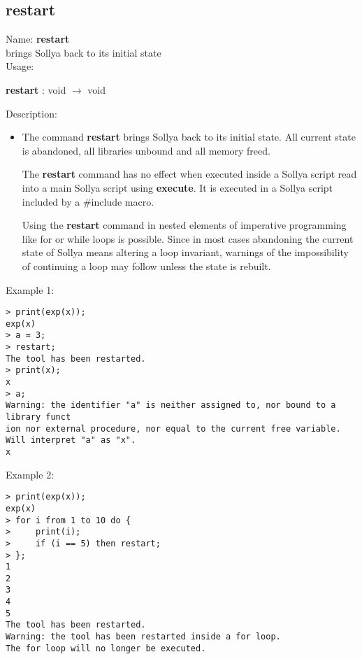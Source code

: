 \subsection{restart}
\label{labrestart}
\noindent Name: \textbf{restart}\\
brings Sollya back to its initial state\\

\noindent Usage: 
\begin{center}
\textbf{restart} : \textsf{void} $\rightarrow$ \textsf{void}\\
\end{center}
\noindent Description: \begin{itemize}

\item The command \textbf{restart} brings Sollya back to its initial state.  All
   current state is abandoned, all libraries unbound and all memory freed.
    
   The \textbf{restart} command has no effect when executed inside a Sollya
   script read into a main Sollya script using \textbf{execute}. It is executed
   in a Sollya script included by a $\#$include macro.
    
   Using the \textbf{restart} command in nested elements of imperative
   programming like for or while loops is possible. Since in most cases
   abandoning the current state of Sollya means altering a loop
   invariant, warnings of the impossibility of continuing a loop may
   follow unless the state is rebuilt.
\end{itemize}
\noindent Example 1: 
\begin{center}\begin{minipage}{15cm}\begin{Verbatim}[frame=single]
> print(exp(x));
exp(x)
> a = 3;
> restart;
The tool has been restarted.
> print(x);
x
> a;
Warning: the identifier "a" is neither assigned to, nor bound to a library funct
ion nor external procedure, nor equal to the current free variable.
Will interpret "a" as "x".
x
\end{Verbatim}
\end{minipage}\end{center}
\noindent Example 2: 
\begin{center}\begin{minipage}{15cm}\begin{Verbatim}[frame=single]
> print(exp(x));
exp(x)
> for i from 1 to 10 do {
>     print(i);
>     if (i == 5) then restart;
> };
1
2
3
4
5
The tool has been restarted.
Warning: the tool has been restarted inside a for loop.
The for loop will no longer be executed.
\end{Verbatim}
\end{minipage}\end{center}
